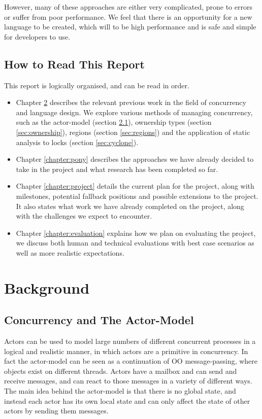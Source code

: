 \documentclass[pdftex,11pt,a4paper]{report}
\begin{document}
However, many of these approaches are either very complicated, prone to errors or suffer from poor performance.
We feel that there is an opportunity for a new language to be created, which will to be high performance and is safe and simple for developers to use.

\section{How to Read This Report}

This report is logically organised, and can be read in order.
\begin{itemize}
\item Chapter \ref{chapter:background} describes the relevant previous work in the field of concurrency and language design.
	We explore various methods of managing concurrency, such as the actor-model (section \ref{sec:actor}), ownership types (section \ref{sec:ownership}), regions (section \ref{sec:regions}) and the application of static analysis to locks (section \ref{sec:cyclone}).
\item Chapter \ref{chapter:pony} describes the approaches we have already decided to take in the project and what research has been completed so far.
\item Chapter \ref{chapter:project} details the current plan for the project, along with milestones, potential fallback positions and possible extensions to the project.
	It also states what work we have already completed on the project, along with the challenges we expect to encounter.
\item Chapter \ref{chapter:evaluation} explains how we plan on evaluating the project, we discuss both human and technical evaluations with best case scenarios as well as more realistic expectations.
\end{itemize}

\newpage
\chapter{Background}
\label{chapter:background}

\section{Concurrency and The Actor-Model}
\label{sec:actor}

Actors can be used to model large numbers of different concurrent processes in a logical and realistic manner, in which actors are a primitive in concurrency.
In fact the actor-model can be seen as a continuation of OO message-passing, where objects exist on different threads.
Actors have a mailbox and can send and receive messages, and can react to those messages in a variety of different ways.
The main idea behind the actor-model is that there is no global state, and instead each actor has its own local state and can only affect the state of other actors by sending them messages.
\end{document}
